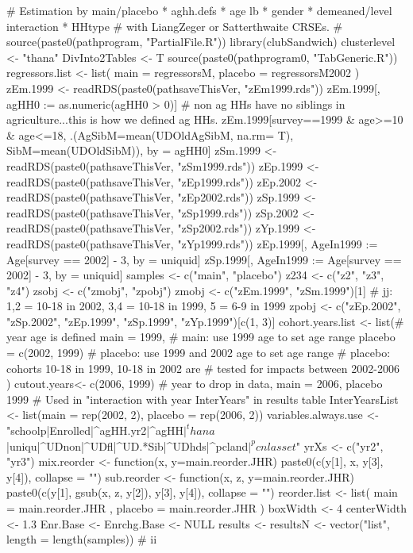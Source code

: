 \begin{Schunk}
\begin{Sinput}
# Estimation by main/placebo * aghh.defs * age lb * gender * demeaned/level interaction * HHtype
# with LiangZeger or Satterthwaite CRSEs.
# source(paste0(pathprogram, "PartialFile.R"))
library(clubSandwich)
clusterlevel <- "thana"
DivInto2Tables <- T
source(paste0(pathprogram0, "TabGeneric.R"))
regressors.list <- list(
  main = regressorsM,
  placebo = regressorsM2002
)
zEm.1999 <- readRDS(paste0(pathsaveThisVer, "zEm1999.rds")) 
zEm.1999[, agHH0 :=  as.numeric(agHH0 > 0)]
# non ag HHs have no siblings in agriculture...this is how we defined ag HHs.
zEm.1999[survey==1999 & age>=10 & age<=18, 
  .(AgSibM=mean(UDOldAgSibM, na.rm= T), SibM=mean(UDOldSibM)), by = agHH0]
zSm.1999 <- readRDS(paste0(pathsaveThisVer, "zSm1999.rds")) 
zEp.1999 <- readRDS(paste0(pathsaveThisVer, "zEp1999.rds")) 
zEp.2002 <- readRDS(paste0(pathsaveThisVer, "zEp2002.rds")) 
zSp.1999 <- readRDS(paste0(pathsaveThisVer, "zSp1999.rds")) 
zSp.2002 <- readRDS(paste0(pathsaveThisVer, "zSp2002.rds")) 
zYp.1999 <- readRDS(paste0(pathsaveThisVer, "zYp1999.rds")) 
zEp.1999[, AgeIn1999 := Age[survey == 2002] - 3, by = uniquid]
zSp.1999[, AgeIn1999 := Age[survey == 2002] - 3, by = uniquid]
samples <- c("main", "placebo")
z234 <- c("z2", "z3", "z4")
zsobj <- c("zmobj", "zpobj")
zmobj <- c("zEm.1999", "zSm.1999")[1]
# jj: 1,2 = 10-18 in 2002, 3,4 = 10-18 in 1999, 5 = 6-9 in 1999
zpobj <- c("zEp.2002", "zSp.2002", "zEp.1999", "zSp.1999", "zYp.1999")[c(1, 3)]
cohort.years.list <- list(# year age is defined
  main = 1999,  # main: use 1999 age to set age range
  placebo = c(2002, 1999)
  # placebo: use 1999 and 2002 age to set age range
  # placebo: cohorts 10-18 in 1999, 10-18 in 2002 are 
  #   tested for impacts between 2002-2006
  )
cutout.years<- c(2006, 1999) # year to drop in data, main = 2006, placebo 1999
# Used in "interaction with year InterYears" in results table
InterYearsList <- list(main = rep(2002, 2), placebo = rep(2006, 2))
variables.always.use <- "schoolp|Enrolled|^agHH.yr2|^agHH$|^thana$|uniqu|^UDnon|^UDfl|^UD.*Sib|^UDhds|^pcland$|^pcnlasset$"
yrXs <- c("yr2", "yr3")
mix.reorder <- function(x, y=main.reorder.JHR) 
  paste0(c(y[1], x, y[3], y[4]), collapse = "")
sub.reorder <- function(x, z, y=main.reorder.JHR) 
  paste0(c(y[1], gsub(x, z, y[2]), y[3], y[4]), collapse = "")
reorder.list <- list(
    main = main.reorder.JHR
  , placebo = main.reorder.JHR
)
boxWidth <- 4
centerWidth <- 1.3
Enr.Base <- Enrchg.Base <- NULL
results <- resultsN <- vector("list", length = length(samples)) # ii

\end{Sinput}
\end{Schunk}
